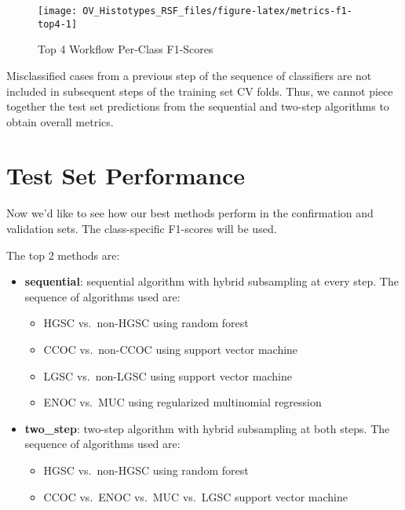 \documentclass[
]{report}
\providecommand{\tightlist}{%
  \setlength{\itemsep}{0pt}\setlength{\parskip}{0pt}}
\begin{document}
\begin{figure}[H]

{\centering \texttt{[image: OV\_Histotypes\_RSF\_files/figure-latex/metrics-f1-top4-1]} 

}

\caption{Top 4 Workflow Per-Class F1-Scores}\label{fig:metrics-f1-top4}
\end{figure}

Misclassified cases from a previous step of the sequence of classifiers are not included in subsequent steps of the training set CV folds. Thus, we cannot piece together the test set predictions from the sequential and two-step algorithms to obtain overall metrics.

\hypertarget{test-set-performance}{%
\section{Test Set Performance}\label{test-set-performance}}

Now we'd like to see how our best methods perform in the confirmation and validation sets. The class-specific F1-scores will be used.

The top 2 methods are:

\begin{itemize}
\tightlist
\item
  \textbf{sequential}: sequential algorithm with hybrid subsampling at every step. The sequence of algorithms used are:

  \begin{itemize}
  \tightlist
  \item
    HGSC vs.~non-HGSC using random forest
  \item
    CCOC vs.~non-CCOC using support vector machine
  \item
    LGSC vs.~non-LGSC using support vector machine
  \item
    ENOC vs.~MUC using regularized multinomial regression
  \end{itemize}
\item
  \textbf{two\_step}: two-step algorithm with hybrid subsampling at both steps. The sequence of algorithms used are:

  \begin{itemize}
  \tightlist
  \item
    HGSC vs.~non-HGSC using random forest
  \item
    CCOC vs.~ENOC vs.~MUC vs.~LGSC support vector machine
  \end{itemize}
\end{itemize}
\end{document}
